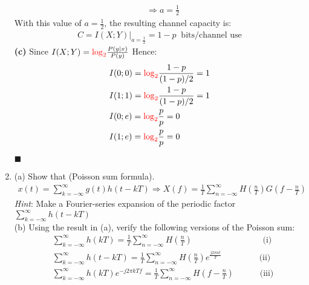 \documentclass[a4paper,12pt]{article}
\begin{document}
\begin{enumerate}
\begin{align*}
                & \Rightarrow a = \frac{1}{2}
            \end{align*}
            With this value of $a = \frac{1}{2}$, the resulting channel capacity is:
            \begin{align*}
                C = I(X;Y)|_{a = \frac{1}{2}} = 1 - p \;\; \text{bits/channel use} 
            \end{align*}
            \textbf{(c)} Since $I(X;Y) = \textcolor{red}{\log_2} \frac{P(y|x)}{P(y)}$ Hence:
            \begin{align*}
                & I(0;0) = \textcolor{red}{\log_2} \frac{1 - p}{(1 - p)/2} = 1 \\
                & I(1;1) = \textcolor{red}{\log_2} \frac{1 - p}{(1 - p)/2} = 1 \\
                & I(0;e) = \textcolor{red}{\log_2} \frac{p}{p} = 0 \\
                & I(1;e) = \textcolor{red}{\log_2} \frac{p}{p} = 0
            \end{align*}
            \begin{flushright}
                $\blacksquare$
            \end{flushright}
        \item 
            (a) Show that (Poisson sum formula).
            \begin{align*}
                x(t) = \sum_{k = - \infty}^{\infty} g(t)h(t - kT) 
                \Rightarrow X(f) = \frac{1}{T} \sum_{n = - \infty}^{\infty} H(\frac{n}{T}) G(f - \frac{n}{T})
            \end{align*}
            \textit{Hint}: Make a Fourier-series expansion of the periodic factor 
            $\sum_{k = - \infty}^{\infty} h(t - kT)$ \\ 
            (b) Using the result in (a), verify the following versions of the Poisson sum: 
            \begin{align*}
                & \sum_{k = - \infty}^{\infty} h(kT) = \frac{1}{T} \sum_{n = - \infty}^{\infty} H(\frac{n}{T}) \;\;\;\;\;\;\;\;\;\;\;\;\;\;\;\;\;\;\;\;\;\;\;\;\;\;\;\;\;\; \text{(i)} \\ 
                & \sum_{k = - \infty}^{\infty} h(t - kT) = \frac{1}{T} \sum_{n = - \infty}^{\infty} H(\frac{n}{T})e^{\frac{j2\pi nt}{T}} \;\;\;\;\;\;\;\;\;\;\;\;\;\;\;\; \text{(ii)} \\ 
                & \sum_{k = - \infty}^{\infty} h(kT) e^{-j2 \pi kTf} = \frac{1}{T} \sum_{n = - \infty}^{\infty}H(f - \frac{n}{T}) \;\;\;\;\;\;\;\;\;\;\; \text{(iii)} \\ 

\end{align*}
\end{enumerate}
\end{document}
